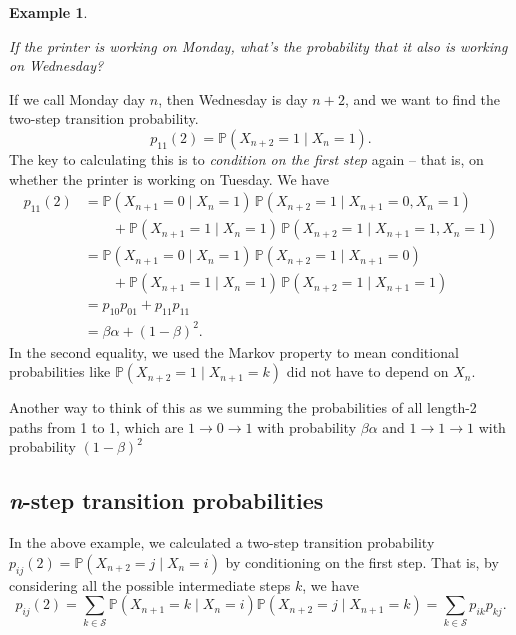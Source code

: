 \documentclass[
  a4paper,
]{article}
\theoremstyle{definition}
\theoremstyle{definition}
\newtheorem{example}{Example}[section]
\theoremstyle{definition}
\theoremstyle{remark}
\begin{document}
\begin{example}
\protect\hypertarget{exm:printer}{}\label{exm:printer}

\emph{If the printer is working on Monday, what's the probability that it also is working on Wednesday?}

If we call Monday day \(n\), then Wednesday is day \(n+2\), and we want to find the two-step transition probability.
\[ p_{11}(2) = \mathbb P (X_{n+2} = 1 \mid X_n = 1) . \]
The key to calculating this is to \emph{condition on the first step} again -- that is, on whether the printer is working on Tuesday. We have
\begin{align*}
  p_{11}(2) &= \mathbb P (X_{n+1} = 0 \mid X_n = 1)\,\mathbb P (X_{n+2} = 1 \mid X_{n+1} = 0, X_n = 1) \\
  &\qquad{} + \mathbb P (X_{n+1} = 1 \mid X_n = 1)\,\mathbb P (X_{n+2} = 1 \mid X_{n+1} = 1, X_n = 1) \\
  &= \mathbb P (X_{n+1} = 0 \mid X_n = 1)\,\mathbb P (X_{n+2} = 1 \mid X_{n+1} = 0) \\
  &\qquad{} + \mathbb P (X_{n+1} = 1 \mid X_n = 1)\,\mathbb P (X_{n+2} = 1 \mid X_{n+1} = 1) \\
  &= p_{10}p_{01} + p_{11}p_{11} \\
  &= \beta\alpha + (1-\beta)^2 .
\end{align*}
In the second equality, we used the Markov property to mean conditional probabilities like \(\mathbb P(X_{n+2} = 1 \mid X_{n+1} = k)\) did not have to depend on \(X_n\).

Another way to think of this as we summing the probabilities of all length-2 paths from 1 to 1, which are \(1\to 0\to 1\) with probability \(\beta\alpha\) and \(1 \to 1 \to 1\) with probability \((1-\beta)^2\)

\end{example}

\hypertarget{n-step}{%
\subsection{\texorpdfstring{\emph{n}-step transition probabilities}{n-step transition probabilities}}\label{n-step}}

In the above example, we calculated a two-step transition probability \(p_{ij}(2) = \mathbb P (X_{n+2} = j \mid X_n = i)\) by conditioning on the first step. That is, by considering all the possible intermediate steps \(k\), we have
\[ p_{ij}(2) = \sum_{k\in\mathcal S} \mathbb P (X_{n+1} = k \mid X_n = i)\mathbb P (X_{n+2} = j \mid X_{n+1} = k) = \sum_{k\in\mathcal S} p_{ik}p_{kj} . \]
\end{document}
